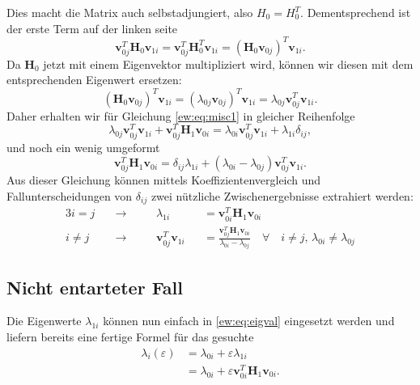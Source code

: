Dies macht die Matrix auch selbstadjungiert, also $H_0 = H_0^T$. Dementsprechend ist der erste Term auf der linken seite
\begin{equation}
    \bm v_{0j}^T \bm H_0 \bm v_{1i}
    =
    \bm v_{0j}^T \bm H_0^T \bm v_{1i}
    =
    \left( \bm H_0 \bm v_{0j} \right)^T \bm v_{1i}.
\end{equation}
Da $\bm H_0$ jetzt mit einem Eigenvektor multipliziert wird, können wir diesen mit dem entsprechenden Eigenwert ersetzen:
\begin{equation}
    \left( \bm H_0 \bm v_{0j} \right)^T \bm v_{1i}
    =
    \left( \lambda_{0j} \bm v_{0j} \right)^T \bm v_{1i}
    =
    \lambda_{0j} \bm v_{0j}^T \bm v_{1i}.
\end{equation}
Daher erhalten wir für Gleichung \eqref{ew:eq:misc1} in gleicher Reihenfolge
\begin{equation}
    \lambda_{0j} \bm v_{0j}^T \bm v_{1i} +
    \bm v_{0j}^T \bm H_1 \bm v_{0i}
    =
    \lambda_{0i} \bm v_{0j}^T \bm v_{1i} +
    \lambda_{1i} \delta_{ij},
\end{equation}
und noch ein wenig umgeformt
\begin{equation}
    \bm v_{0j}^T \bm H_1 \bm v_{0i}
    =
    \delta_{ij} \lambda_{1i} +
    ( \lambda_{0i} - \lambda_{0j} )
    \bm v_{0j}^T  \bm v_{1i} . \label{ew:eq:f}
\end{equation}
Aus dieser Gleichung können mittels Koeffizientenvergleich und Fallunterscheidungen von $\delta_{ij}$ zwei nützliche Zwischenergebnisse extrahiert werden:
\begin{alignat}{3}
    i = j \quad & \rightarrow  \quad && \lambda_{1i}&& = \bm v_{0i}^T \bm H_1 \bm v_{0i} \\
    i \neq j \quad & \rightarrow \quad && \bm v_{0j}^T \bm v_{1i}&& = \frac{\bm v_{0j}^T \bm H_1 \bm v_{0i}}{\lambda_{0i} - \lambda_{0j}} \quad \forall \quad  i \neq j, \, \lambda_{0i} \neq \lambda_{0j}  \label{ew:eq:f2}
\end{alignat}

\subsection{Nicht entarteter Fall}

Die Eigenwerte $\lambda_{1i}$ können nun einfach in \eqref{ew:eq:eigval} eingesetzt werden und liefern bereits eine fertige Formel für das gesuchte
\begin{align*}
    \lambda_i(\varepsilon)
    &=
    \lambda_{0i} + \varepsilon \lambda_{1i} \\
    &=
    \lambda_{0i} + \varepsilon \bm v_{0i}^T \bm H_1 \bm v_{0i}.
\end{align*}

